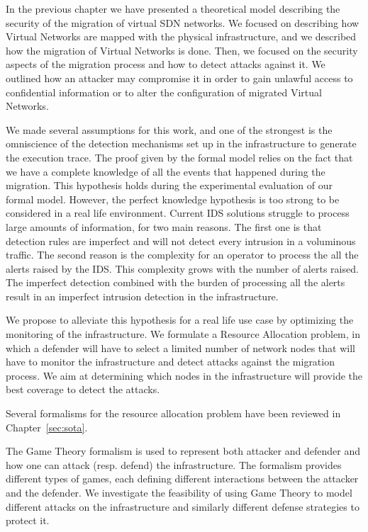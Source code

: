 In the previous chapter we have presented a theoretical model describing the security of the migration of virtual SDN networks. We focused on describing how Virtual Networks are mapped with the physical infrastructure, and we described how the migration of Virtual Networks is done. Then, we focused on the security aspects of the migration process and how to detect attacks against it. We outlined how an attacker may compromise it in order to gain unlawful access to confidential information or to alter the configuration of migrated Virtual Networks.

We made several assumptions for this work, and one of the strongest is the omniscience of the detection mechanisms set up in the infrastructure to generate the execution trace. The proof given by the formal model relies on the fact that we have a complete knowledge of all the events that happened during the migration.  This hypothesis holds during the experimental evaluation of our formal model. 
However, the perfect knowledge hypothesis is too strong to be considered in a real life environment. 
Current IDS solutions struggle to process large amounts of information, for two main reasons. The first one is that detection rules are imperfect and will not detect every intrusion in a voluminous traffic. The second reason is the complexity for an operator to process the all the alerts raised by the IDS. This complexity grows with the number of alerts raised. The imperfect detection combined with the burden of processing all the alerts result in an imperfect intrusion detection in the infrastructure.

We propose to alleviate this hypothesis for a real life use case by optimizing the monitoring of the infrastructure. We formulate a Resource Allocation problem, in which a defender will have to select a limited number of network nodes that will have to monitor the infrastructure and detect attacks against the migration process. We aim at determining which nodes in the infrastructure will provide the best coverage to detect the attacks. 

Several formalisms for the resource allocation problem have been reviewed in Chapter~\ref{sec:sota}.

The Game Theory formalism is used to represent both attacker and defender and how one can attack (resp. defend) the infrastructure.
The formalism provides different types of games, each defining different interactions between the attacker and the defender.
We investigate the feasibility of using Game Theory to model different attacks on the infrastructure and similarly different defense strategies to protect it.

